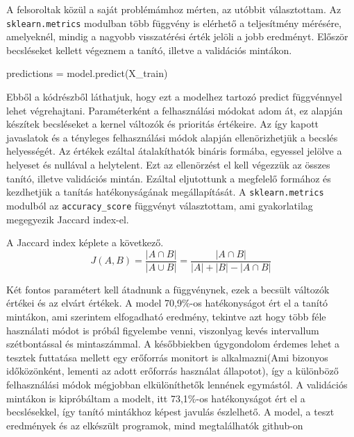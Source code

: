 A felsoroltak közül a saját problémámhoz mérten, az utóbbit választottam.
Az \texttt{sklearn.metrics} modulban több függvény is elérhető a teljesítmény mérésére, amelyeknél, mindig a nagyobb visszatérési érték jelöli a jobb eredményt.
Először becsléseket kellett végeznem a tanító, illetve a validációs mintákon.

\begin{python}
predictions = model.predict(X_train)
\end{python}

Ebből a kódrészből láthatjuk, hogy ezt a modelhez tartozó predict függvénnyel lehet végrehajtani. Paraméterként a felhasználási módokat adom át, ez alapján készítek becsléseket a kernel változók és prioritás értékeire. Az így kapott javaslatok és a tényleges felhasználási módok alapján ellenörizhetjük a becslés helyességét. Az értékek ezáltal átalakíthatók bináris formába, egyessel jelölve a helyeset és nullával a helytelent. Ezt az ellenörzést el kell végezzük az összes tanító, illetve validációs mintán.
Ezáltal eljutottunk a megfelelő formához és kezdhetjük a tanítás hatékonyságának megállapítását.
A \texttt{sklearn.metrics} modulból az \texttt{accuracy\_score} függvényt választottam, ami gyakorlatilag megegyezik Jaccard index-el.

A Jaccard index képlete a következő.
\begin{equation}
J(A,B) = \frac{|A \cap B|}{|A \cup B|} = \frac{|A \cap B|}{|A| + |B| - |A \cap B|}
\end{equation}

Két fontos paramétert kell átadnunk a függvénynek, ezek a becsült változók értékei és az elvárt értékek.
A model 70,9\%-os hatékonyságot ért el a tanító mintákon, ami szerintem elfogadható eredmény, tekintve azt hogy több féle használati módot is próbál figyelembe venni, viszonlyag kevés intervallum szétbontással és mintaszámmal. A későbbiekben úgygondolom érdemes lehet a tesztek futtatása mellett egy erőforrás monitort is alkalmazni(Ami bizonyos időközönként, lementi az adott erőforrás használat állapotot), így a különböző felhasználási módok mégjobban elkülöníthetők lennének egymástól.
A validációs mintákon is kipróbáltam a modelt, itt 73,1\%-os hatékonyságot ért el a becslésekkel, így tanító mintákhoz képest javulás észlelhető.
A model, a teszt eredmények és az elkészült programok, mind megtalálhatók github-on

